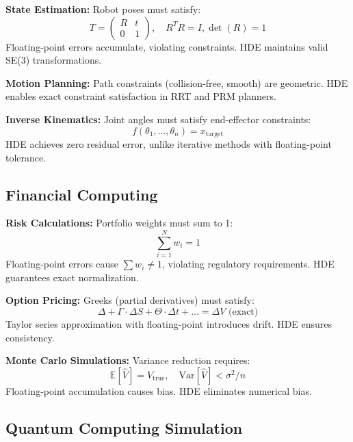 \documentclass{article}
\begin{document}
\textbf{State Estimation:} Robot poses must satisfy:
\begin{equation}
T = \begin{pmatrix} R & t \\ 0 & 1 \end{pmatrix}, \quad R^T R = I, \det(R) = 1
\end{equation}
Floating-point errors accumulate, violating constraints. HDE maintains valid SE(3) transformations.

\textbf{Motion Planning:} Path constraints (collision-free, smooth) are geometric. HDE enables exact constraint satisfaction in RRT and PRM planners.

\textbf{Inverse Kinematics:} Joint angles must satisfy end-effector constraints:
\begin{equation}
f(\theta_1, \ldots, \theta_n) = x_{\text{target}}
\end{equation}
HDE achieves zero residual error, unlike iterative methods with floating-point tolerance.

\subsection{Financial Computing}

\textbf{Risk Calculations:} Portfolio weights must sum to 1:
\begin{equation}
\sum_{i=1}^{N} w_i = 1
\end{equation}
Floating-point errors cause $\sum w_i \neq 1$, violating regulatory requirements. HDE guarantees exact normalization.

\textbf{Option Pricing:} Greeks (partial derivatives) must satisfy:
\begin{equation}
\Delta + \Gamma \cdot \Delta S + \Theta \cdot \Delta t + \ldots = \Delta V \text{ (exact)}
\end{equation}
Taylor series approximation with floating-point introduces drift. HDE ensures consistency.

\textbf{Monte Carlo Simulations:} Variance reduction requires:
\begin{equation}
\mathbb{E}[\hat{V}] = V_{\text{true}}, \quad \text{Var}[\hat{V}] < \sigma^2/n
\end{equation}
Floating-point accumulation causes bias. HDE eliminates numerical bias.

\subsection{Quantum Computing Simulation}
\end{document}

